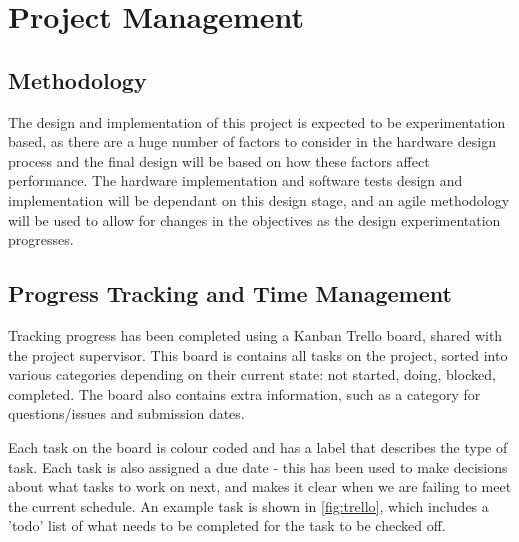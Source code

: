 \chapter{Project Management}
\label{ch:project_management}

\section{Methodology}
The design and implementation of this project is expected to be experimentation based, as there are a huge number of factors to consider in the hardware design process and the final design will be based on how these factors affect performance. The hardware implementation and software tests design and implementation will be dependant on this design stage, and an agile methodology will be used to allow for changes in the objectives as the design experimentation progresses.

\section{Progress Tracking and Time Management}
Tracking progress has been completed using a Kanban Trello board, shared with the project supervisor. This board is contains all tasks on the project, sorted into various categories depending on their current state: not started, doing, blocked, completed. The board also contains extra information, such as a category for questions/issues and submission dates.

Each task on the board is colour coded and has a label that describes the type of task. Each task is also assigned a due date - this has been used to make decisions about what tasks to work on next, and makes it clear when we are failing to meet the current schedule. An example task is shown in \ref{fig:trello}, which includes a 'todo' list of what needs to be completed for the task to be checked off.

